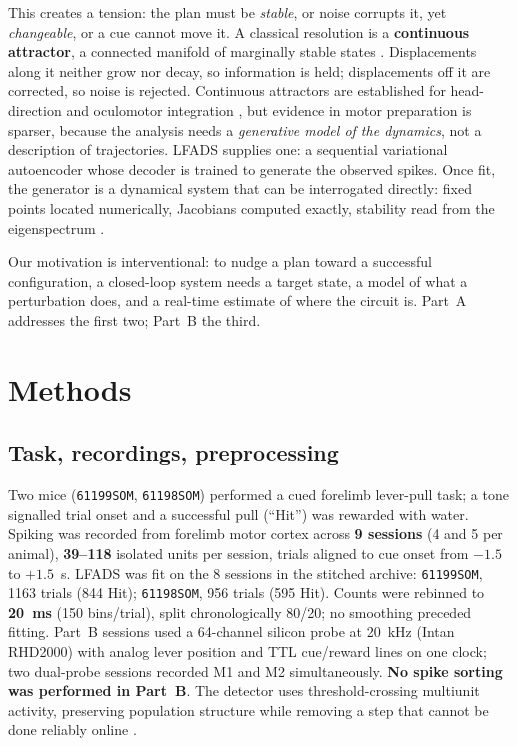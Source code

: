 \documentclass[10pt,twocolumn]{article}
\begin{document}
This creates a tension: the plan must be \emph{stable}, or noise corrupts it,
yet \emph{changeable}, or a cue cannot move it. A classical resolution is a
\textbf{continuous attractor}, a connected manifold of marginally stable
states \cite{seung1996,zhang1996}. Displacements along it neither grow nor decay,
so information is held; displacements off it are corrected, so noise is
rejected. Continuous attractors are established for head-direction and
oculomotor integration \cite{zhang1996}, but evidence in motor
preparation is sparser, because the analysis needs a \emph{generative model of
the dynamics}, not a description of trajectories. LFADS \cite{pandarinath2018}
supplies one: a sequential variational autoencoder whose decoder is trained to
generate the observed spikes. Once fit, the generator is a dynamical system that
can be interrogated directly: fixed points located numerically, Jacobians
computed exactly, stability read from the eigenspectrum \cite{sussillo2013}.

Our motivation is interventional: to nudge a plan toward a successful
configuration, a closed-loop system needs a target state, a model of what a
perturbation does, and a real-time estimate of where the circuit is. Part~A
addresses the first two; Part~B the third.

\section{Methods}

\subsection{Task, recordings, preprocessing}

Two mice (\texttt{61199SOM}, \texttt{61198SOM}) performed a cued forelimb
lever-pull task; a tone signalled trial onset and a successful pull (``Hit'')
was rewarded with water. Spiking was recorded from forelimb motor cortex across
\textbf{9 sessions} (4 and 5 per animal), \textbf{39--118} isolated units per
session, trials aligned to cue onset from $-1.5$ to $+1.5$~s. LFADS was fit on
the 8 sessions in the stitched archive: \texttt{61199SOM}, 1163 trials (844
Hit); \texttt{61198SOM}, 956 trials (595 Hit). Counts were rebinned to
\textbf{20~ms} (150 bins/trial), split chronologically 80/20; no smoothing
preceded fitting. Part~B sessions used a 64-channel silicon probe at 20~kHz
(Intan RHD2000) with analog lever position and TTL cue/reward lines on one
clock; two dual-probe sessions recorded M1 and M2 simultaneously. \textbf{No
spike sorting was performed in Part~B}. The detector uses threshold-crossing
multiunit activity, preserving population structure while removing a step that
cannot be done reliably online \cite{trautmann2019}.
\end{document}
